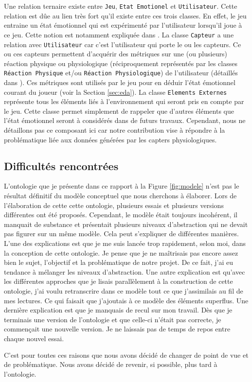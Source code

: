 \documentclass[11pt]{article}
\begin{document}
		Une relation ternaire existe entre \texttt{Jeu}, \texttt{Etat Emotionel} et \texttt{Utilisateur}.
		Cette relation est dûe au lien très fort qu'il existe entre ces trois classes.
		En effet, le jeu entraine un état émotionnel qui est expérimenté par l'utilisateur lorsqu'il joue à ce jeu.
		Cette notion est notamment expliquée dans \cite{calvo_et_al._2015}.
		La classe \texttt{Capteur} a une relation avec \texttt{Utilisateur} car c'est l'utilisateur qui porte le ou les capteurs.
		Ce ou ces capteurs permettent d'acquérir des métriques sur une (ou plusieurs) réaction physique ou physiologique (réciproquement représentés par les classes \texttt{Réaction Physique} et/ou \texttt{Réaction Physiologique}) de l'utilisateur  (détaillés dans \cite{shu_et_al._2018}).
		Ces métriques sont utilisés par le jeu pour en déduir l'état émotionnel courant du joueur (voir la Section \ref{sec:eda}).
		La classe \texttt{Elements Externes} représente tous les éléments liés à l'environnement qui seront pris en compte par le jeu.
		Cette classe permet simplement de rappeler que d'autres éléments que l'état émotionnel seront à considérés dans de futurs travaux.
		Cependant, nous ne détaillons pas ce composant ici car notre contribution vise à répondre à la problématique liée aux données générées par les capters physiologiques.
	\subsection{Difficultés rencontrées}\label{sec:difficultes}
		L'ontologie que je présente dans ce rapport à la Figure \ref{fig:modele} n'est pas le résultat définitif du modèle conceptuel que nous cherchons à élaborer.
		Lors de l'élaboration de cette cette ontologie, plusieurs essais et plusieurs versions différentes ont été proposés.
		Cependant, le modèle était toujours incohérent, il manquait de substance et présentait plusieurs niveaux d'abstraction qui ne devait pas figurer sur un même modèle. 
		Cela peut s'expliquer de différentes manières. 
		L'une des explications est que je me suis lancée trop rapidement, selon moi, dans la conception de cette ontologie.
		Je pense que je ne maîtrisais pas encore assez bien le sujet, l'objectif et la problématique de notre projet.
		De ce fait, j'ai eu tendance à mélanger les niveaux d'abstraction.
		Une autre explication est qu'avec les différentes approches que je lisais parallèlement à la construction de cette ontologie, j'ai voulu retranscrire dans ce modèle tout ce que j'assimilais au fil de mes lectures.
		Ce qui faisait que j'ajoutais à ce modèle des éléments superflus.
		Une dernière explication est que je manquais de recul sur mon travail.
		Dès que je terminais une version de l'ontologie et que celle-ci n'était pas correcte, je commençait une nouvelle version.
		Je ne laissais pas de temps de repos entre chaque nouvel essai.\par
		C'est pour toutes ces raisons que nous avons décidé de changer de point de vue et de problématique.
		Nous avons décidé de revenir, si possible, plus tard à l'ontologie.
\end{document}
